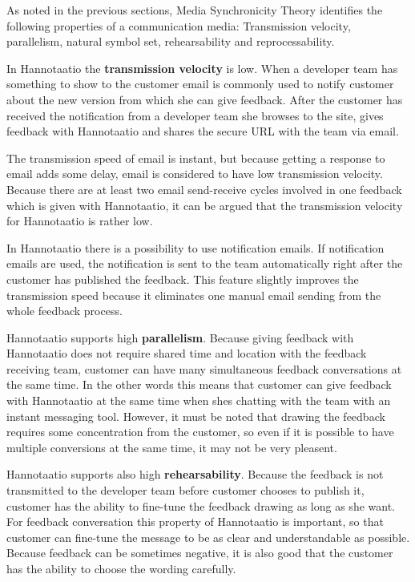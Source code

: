 \documentclass[english,12pt,a4paper,pdftex]{article}
\begin{document}
As noted in the previous sections, Media Synchronicity Theory identifies the following properties of a communication media: Transmission velocity, parallelism, natural symbol set, rehearsability and reprocessability.

In Hannotaatio the \textbf{transmission velocity} is low. When a developer team has something to show to the customer email is commonly used to notify customer about the new version from which she can give feedback. After the customer has received the notification from a developer team she browses to the site, gives feedback with Hannotaatio and shares the secure URL with the team via email.

The transmission speed of email is instant, but because getting a response to email adds some delay, email is considered to have low transmission velocity. Because there are at least two email send-receive cycles involved in one feedback which is given with Hannotaatio, it can be argued that the transmission velocity for Hannotaatio is rather low.

In Hannotaatio there is a possibility to use notification emails. If notification emails are used, the notification is sent to the team automatically right after the customer has published the feedback. This feature slightly improves the transmission speed because it eliminates one manual email sending from the whole feedback process.

Hannotaatio supports high \textbf{parallelism}. Because giving feedback with Hannotaatio does not require shared time and location with the feedback receiving team, customer can have many simultaneous feedback conversations at the same time. In the other words this means that customer can give feedback with Hannotaatio at the same time when shes chatting with the team with an instant messaging tool. However, it must be noted that drawing the feedback requires some concentration from the customer, so even if it is possible to have multiple conversions at the same time, it may not be very pleasent.

Hannotaatio supports also high \textbf{rehearsability}. Because the feedback is not transmitted to the developer team before customer chooses to publish it, customer has the ability to fine-tune the feedback drawing as long as she want. For feedback conversation this property of Hannotaatio is important, so that customer can fine-tune the message to be as clear and understandable as possible. Because feedback can be sometimes negative, it is also good that the customer has the ability to choose the wording carefully.
\end{document}
